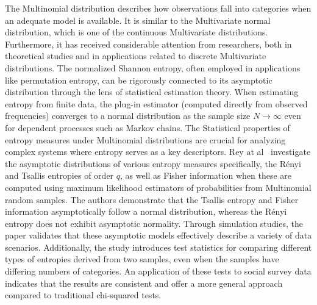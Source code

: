 The Multinomial distribution describes how observations fall into categories when an adequate model is available. It is similar to the Multivariate normal distribution, which is one of the continuous Multivariate distributions. Furthermore, it has received considerable attention from researchers, both in theoretical studies and in applications related to discrete Multivariate distributions. 
The normalized Shannon entropy, often employed in applications like permutation entropy, can be rigorously connected to its asymptotic distribution through the lens of statistical estimation theory. When estimating entropy from finite data, the plug-in estimator (computed directly from observed frequencies) converges to a normal distribution as the sample size $N\longrightarrow \infty$ even for dependent processes such as Markov chains. 
The Statistical properties of entropy measures under Multinomial distributions are crucial for analyzing complex systems where entropy serves as a key descriptors. Rey at al~\cite{Rey2023} investigate the asymptotic distributions of various entropy measures specifically, the Rényi and Tsallis entropies of order $q$, as well as Fisher information when these are computed using maximum likelihood estimators of probabilities from Multinomial random samples. The authors demonstrate that the Tsallis entropy and Fisher information asymptotically follow a normal distribution, whereas the Rényi entropy does not exhibit asymptotic normality. Through simulation studies, the paper validates that these asymptotic models effectively describe a variety of data scenarios. Additionally, the study introduces test statistics for comparing different types of entropies derived from two samples, even when the samples have differing numbers of categories. An application of these tests to social survey data indicates that the results are consistent and offer a more general approach compared to traditional chi-squared tests. 


